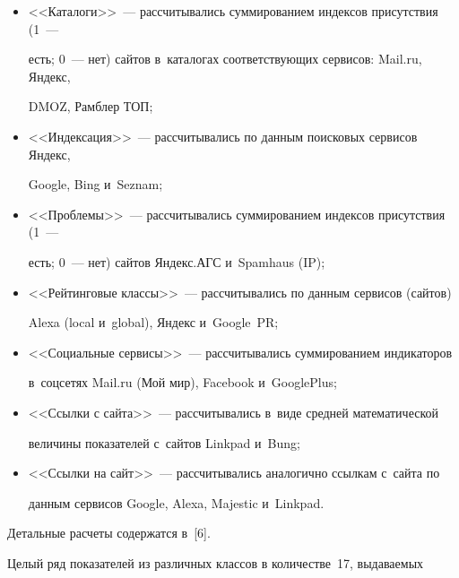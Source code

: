   \begin{itemize}


  \item


<<Каталоги>>~--- рассчитывались суммированием индексов присутствия (1~--- 


есть; 0~--- нет) сайтов в~каталогах соответствующих сервисов: Mail.ru, Яндекс, 


DMOZ, Рамблер ТОП;


\item


<<Индексация>>~--- рассчитывались по данным поисковых сервисов Яндекс, 


Google, Bing и~Seznam;


\item


<<Проблемы>>~--- рассчитывались суммированием индексов присутствия (1~--- 


есть; 0~--- нет) сайтов Яндекс.АГС и~Spamhaus (IP);


\item


<<Рейтинговые классы>>~--- рассчитывались по данным сервисов (сайтов) 


Alexa (local и~global), Яндекс и~Google~PR;


\item


<<Социальные сервисы>>~--- рассчитывались суммированием индикаторов 


в~соцсетях Mail.ru (Мой мир), Facebook и~GooglePlus;


\item


<<Ссылки с сайта>>~--- рассчитывались в~виде средней математической 


величины показателей с~сайтов Linkpad и~Bung; 


\item


<<Ссылки на сайт>>~--- рассчитывались аналогично ссылкам с~сайта по 


данным сервисов Google, Alexa, Majestic и~Linkpad.


\end{itemize}





Детальные расчеты содержатся в~[6]. 





  Целый ряд показателей из различных классов в количестве~17, выдаваемых 


